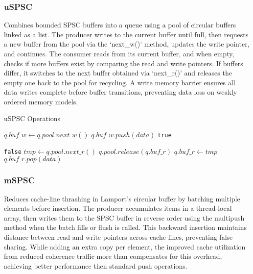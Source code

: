 \subsubsection{\acl{uSPSC}}
Combines bounded SPSC buffers into a queue using a pool of circular buffers linked as a list. The producer writes to the current buffer until full, then requests a new buffer from the pool via the \enquote*{next\_w()} method, updates the write pointer, and continues. The consumer reads from its current buffer, and when empty, checks if more buffers exist by comparing the read and write pointers. If buffers differ, it switches to the next buffer obtained via \enquote*{next\_r()} and releases the empty one back to the pool for recycling. A write memory barrier ensures all data writes complete before buffer transitions, preventing data loss on weakly ordered memory models. \cite{Aldinucci2012EfficientSync}

\begin{algorithm}[!ht]
    \centering
    \captionsetup{justification=centering}
    \caption{\acl{uSPSC} Operations\cite{Aldinucci2012EfficientSync}}
    \label{alg:uspsc}
    \scriptsize
    \begin{algorithmic}[1]
             
                \State $q.buf\_w \gets q.pool.next\_w()$ 
            \EndIf
            \State $q.buf\_w.push(data)$
            \State \Return \texttt{true}
        \EndFunction
        
        \State
        
                 
                    \State \Return \texttt{false} 
                \EndIf
                 
                    \State $tmp \gets q.pool.next\_r()$
                    \State $q.pool.release(q.buf\_r)$ 
                    \State $q.buf\_r \gets tmp$
                \EndIf
            \EndIf
            \State \Return $q.buf\_r.pop(data)$
        \EndFunction
    \end{algorithmic}
 \end{algorithm}

\subsubsection{\acl{mSPSC}}
Reduces cache-line thrashing in Lamport's circular buffer by batching multiple elements before insertion. The producer accumulates items in a thread-local array, then writes them to the SPSC buffer in reverse order using the multipush method when the batch fills or flush is called. This backward insertion maintains distance between read and write pointers across cache lines, preventing false sharing. While adding an extra copy per element, the improved cache utilization from reduced coherence traffic more than compensates for this overhead, achieving better performance then standard push operations. \cite{torquati2010singleproducersingleconsumerqueuessharedcache}

